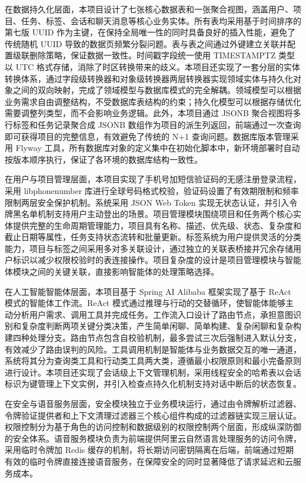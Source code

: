 \par 在数据持久化层面，本项目设计了七张核心数据表和一张聚合视图，涵盖用户、项目、任务、标签、会话和聊天消息等核心业务实体。所有表均采用基于时间排序的第七版 UUID 作为主键，在保持全局唯一性的同时具备良好的插入性能，避免了传统随机 UUID 导致的数据页频繁分裂问题。表与表之间通过外键建立关联并配置级联删除策略，保证数据一致性。时间戳字段统一使用 TIMESTAMPTZ 类型以 UTC 格式存储，消除了时区转换带来的歧义。本项目还实现了一套分层的实体转换体系，通过字段级转换器和对象级转换器两层转换器实现领域实体与持久化对象之间的双向映射，完成了领域模型与数据库模式的完全解耦。领域模型可以根据业务需求自由调整结构，不受数据库表结构的约束；持久化模型可以根据存储优化需要调整列类型，而不会影响业务逻辑。此外，本项目通过 JSONB 聚合视图将多行标签和任务记录聚合成 JSONB 数组作为项目的派生列返回，前端通过一次查询即可获得项目的完整信息，有效避免了传统的 N+1 查询问题。数据库版本管理采用 Flyway 工具，所有数据库对象的定义集中在初始化脚本中，新环境部署时自动按版本顺序执行，保证了各环境的数据库结构一致性。

\par 在用户与项目管理层面，本项目实现了手机号加短信验证码的无感注册登录流程，采用 libphonenumber 库进行全球号码格式校验，验证码设置了有效期限制和频率限制两层安全保护机制。系统采用 JSON Web Token 实现无状态认证，并引入令牌黑名单机制支持用户主动登出的场景。项目管理模块围绕项目和任务两个核心实体提供完整的生命周期管理能力，项目具有名称、描述、优先级、状态、复杂度和截止日期等属性，任务支持状态流转和批量更新。标签系统为用户提供灵活的分类能力，项目与标签之间采用多对多关联设计，通过独立的关联表桥接并冗余存储用户标识以减少权限校验时的表连接操作。项目复杂度的设计是项目管理模块与智能体模块之间的关键关联，直接影响智能体的处理策略选择。

\par 在人工智能智能体层面，本项目基于 Spring AI Alibaba 框架实现了基于 ReAct 模式的智能体工作流。ReAct 模式通过推理与行动的交替循环，使智能体能够主动分析用户需求、调用工具并完成任务。工作流入口设计了路由节点，承担意图识别和复杂度判断两项关键分类决策，产生简单闲聊、简单构建、复杂闲聊和复杂构建四种处理分支。路由节点包含自校验机制，最多尝试三次后强制进入默认分支，有效减少了路由误判的风险。工具调用机制是智能体与业务数据交互的唯一通道，系统将其分为查询类工具和行动类工具两大类，遵循最小权限原则和最小完备原则进行设计。本项目还实现了会话级上下文管理机制，采用线程安全的哈希表以会话标识为键管理上下文实例，并引入检查点持久化机制支持对话中断后的状态恢复。

\par 在安全与语音服务层面，安全模块独立于业务模块运行，通过由令牌解析过滤器、令牌验证提供者和上下文清理过滤器三个核心组件构成的过滤器链实现三层认证。权限控制分为基于角色的访问控制和数据级别的权限控制两个层面，形成纵深防御的安全体系。语音服务模块负责为前端提供阿里云自然语言处理服务的访问令牌，采用临时令牌加 Redis 缓存的机制，将长期访问密钥隔离在后端，前端通过短期有效的临时令牌直接连接语音服务，在保障安全的同时显著降低了请求延迟和云服务成本。

